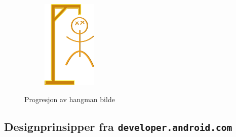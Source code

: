 \begin{figure}[ht]
\begin{subfigure}[b]{0.1\textwidth}
        \includegraphics[width=\textwidth]{./img/gui/hang6.png}
    \end{subfigure}
    \caption{Progresjon av hangman bilde}
    \label{fig:hangman_progresjon}
\end{figure}

\subsection{Designprinsipper fra \texttt{developer.android.com}}

